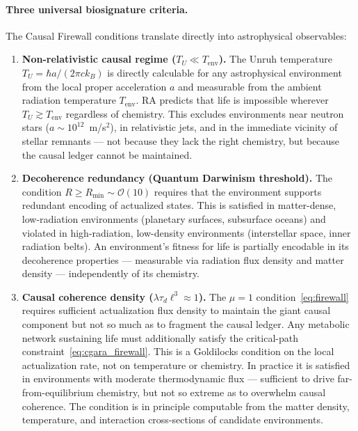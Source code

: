 \documentclass[11pt,a4paper]{article}
\theoremstyle{plain}
\theoremstyle{definition}
\theoremstyle{remark}
\begin{document}
\paragraph{Three universal biosignature criteria.}
The Causal Firewall conditions translate directly into astrophysical observables:

\begin{enumerate}[noitemsep]
  \item \textbf{Non-relativistic causal regime ($T_U \ll T_{\mathrm{env}}$).}
  The Unruh temperature $T_U = \hbar a / (2\pi c k_B)$ is directly calculable
  for any astrophysical environment from the local proper acceleration $a$ and
  measurable from the ambient radiation temperature $T_{\mathrm{env}}$. RA
  predicts that life is impossible wherever $T_U \gtrsim T_{\mathrm{env}}$
  regardless of chemistry. This excludes environments near neutron stars
  ($a \sim 10^{12}$~m/s$^2$), in relativistic jets, and in the immediate
  vicinity of stellar remnants --- not because they lack the right chemistry,
  but because the causal ledger cannot be maintained.

  \item \textbf{Decoherence redundancy (Quantum Darwinism threshold).}
  The condition $R \geq R_{\min} \sim \mathcal{O}(10)$ requires that the
  environment supports redundant encoding of actualized states. This is
  satisfied in matter-dense, low-radiation environments (planetary surfaces,
  subsurface oceans) and violated in high-radiation, low-density environments
  (interstellar space, inner radiation belts). An environment's fitness for life
  is partially encodable in its decoherence properties --- measurable via
  radiation flux density and matter density --- independently of its
  chemistry.

  \item \textbf{Causal coherence density ($\lambda\tau_d\ell^3 \approx 1$).}
  The $\mu = 1$ condition~\eqref{eq:firewall} requires sufficient actualization
  flux density to maintain the giant causal component but not so much as to
  fragment the causal ledger. Any metabolic network sustaining life must
  additionally satisfy the critical-path constraint~\eqref{eq:cgara_firewall}.
  This is a Goldilocks condition on the local actualization
  rate, not on temperature or chemistry. In practice it is satisfied in
  environments with moderate thermodynamic flux --- sufficient to drive
  far-from-equilibrium chemistry, but not so extreme as to overwhelm causal
  coherence. The condition is in principle computable from the matter density,
  temperature, and interaction cross-sections of candidate environments.
\end{enumerate}
\end{document}
